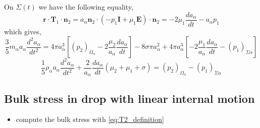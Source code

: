 On $\Sigma(t)$ we have the following equality,
\begin{equation}
    \textbf{r}\cdot\textbf{T}_1\cdot\textbf{n}_2 
    = a_\alpha \textbf{n}_2\cdot(-p_1 \textbf{I}+ \mu_1 \textbf{E})\cdot\textbf{n}_2 
    = -2\mu_1\frac{d a_\alpha}{dt}-a_\alpha p_1
\end{equation}
which gives,
\begin{equation}
    \frac{3}{5}
    m_\alpha 
    a_\alpha
    \frac{d^2 a_\alpha}{dt^2}
    = 4\pi a_\alpha^3\left[
         (p_2)_{\Omega_{\alpha}}
        - 2\frac{\mu_2}{a_\alpha}\frac{d a_\alpha}{dt} 
    \right]
    - 8\sigma  \pi a_\alpha^2
    + 4 \pi a^3_\alpha \left[
        - 2\frac{\mu_1}{a_\alpha} \frac{d a_\alpha}{dt}
        -  (p_1)_{\Sigma\alpha}
    \right]
\end{equation}
\begin{equation}
    \frac{1}{5}
    \rho_\alpha 
    a_\alpha
    \frac{d^2 a_\alpha}{dt^2}
    + \frac{2}{a_\alpha}\frac{d a_\alpha}{dt} \left(
        \mu_2 
        + \mu_1 
        + \sigma
    \right)
    = 
         (p_2)_{\Omega_{\alpha}}
        - \left(p_1\right)_{\Sigma\alpha}
\end{equation}

\subsection{Bulk stress in drop with linear internal motion}

\begin{itemize}
    \item compute the bulk stress with \ref{eq:T2_definition}
\end{itemize}


